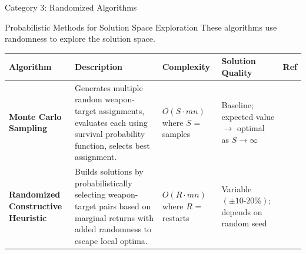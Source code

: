 \documentclass[aspectratio=43,8pt]{beamer}
\begin{document}
\begin{frame}{Category 3: Randomized Algorithms}
\begin{block}{Probabilistic Methods for Solution Space Exploration}
These algorithms use randomness to explore the solution space.
\end{block}

\vspace{0.3cm}
\begin{table}[h]
\centering
\small
\begin{tabular}{p{1.8cm}p{3.6cm}p{1.6cm}p{1.7cm}p{0.8cm}}
\toprule
\textbf{Algorithm} & \textbf{Description} & \textbf{Complexity} & \textbf{Solution Quality} & \textbf{Ref} \\
\midrule
\textbf{Monte Carlo Sampling} & Generates multiple random weapon-target assignments, evaluates each using survival probability function, selects best assignment. & $O(S \cdot mn)$ where $S$ = samples & Baseline; expected value $\to$ optimal as $S \to \infty$ & \cite{hindawi2017} \\
\addlinespace
\textbf{Randomized Constructive Heuristic} & Builds solutions by probabilistically selecting weapon-target pairs based on marginal returns with added randomness to escape local optima. & $O(R \cdot mn)$ where $R$ = restarts & Variable $(\pm 10\text{-}20\%)$; depends on random seed & \cite{kline2020} \\
\bottomrule
\end{tabular}
\end{table}

\end{frame}
\end{document}
